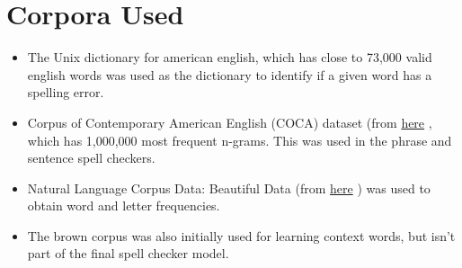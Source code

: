 \section{Corpora Used}
\begin{itemize}

\item The Unix dictionary for american english, which has close to 73,000 valid english words was used as the dictionary to identify if a given word has a spelling error.

\item Corpus of Contemporary American English (COCA) dataset (from \href{http://www.ngrams.info/download_coca.asp}{here} , which has 1,000,000 most frequent n-grams. This was used in the phrase and sentence spell checkers.	

\item Natural Language Corpus Data: Beautiful Data (from \href{http://norvig.com/ngrams/}{here}
) was used to obtain word and letter frequencies.

\item The brown corpus was also initially used for learning context words, but isn't part of the final spell checker model.

\end{itemize}

